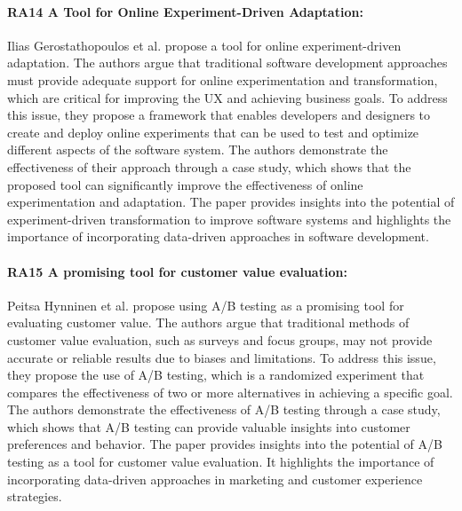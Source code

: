 \paragraph{RA14 A Tool for Online Experiment-Driven Adaptation:}
Ilias Gerostathopoulos et al. \cite{misc:experiment:ilias} propose a tool for online experiment-driven adaptation. 
The authors argue that traditional software development approaches must provide adequate support for online experimentation and transformation, which are critical for improving the UX and achieving business goals. 
To address this issue, they propose a framework that enables developers and designers to create and deploy online experiments that can be used to test and optimize different aspects of the software system. 
The authors demonstrate the effectiveness of their approach through a case study, which shows that the proposed tool can significantly improve the effectiveness of online experimentation and adaptation. 
The paper provides insights into the potential of experiment-driven transformation to improve software systems and highlights the importance of incorporating data-driven approaches in software development.

\paragraph{RA15 A promising tool for customer value evaluation:}
Peitsa Hynninen et al. \cite{misc:abtest:marjo} propose using A/B testing as a promising tool for evaluating customer value. 
The authors argue that traditional methods of customer value evaluation, such as surveys and focus groups, may not provide accurate or reliable results due to biases and limitations. 
To address this issue, they propose the use of A/B testing, which is a randomized experiment that compares the effectiveness of two or more alternatives in achieving a specific goal. 
The authors demonstrate the effectiveness of A/B testing through a case study, which shows that A/B testing can provide valuable insights into customer preferences and behavior. 
The paper provides insights into the potential of A/B testing as a tool for customer value evaluation. 
It highlights the importance of incorporating data-driven approaches in marketing and customer experience strategies. 

\clearpage
